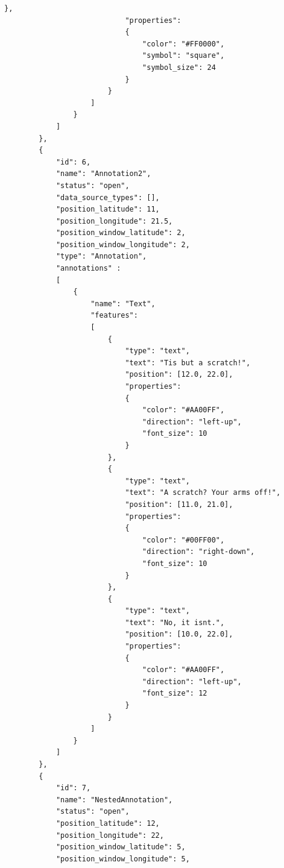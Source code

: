 \begin{lstlisting}[basicstyle=\small\ttfamily]
                            },
                            "properties":
                            {
                                "color": "#FF0000",
                                "symbol": "square",
                                "symbol_size": 24
                            }
                        }
                    ]
                }
            ]
        },
        {
            "id": 6,
            "name": "Annotation2",
            "status": "open",
            "data_source_types": [],
            "position_latitude": 11,
            "position_longitude": 21.5,
            "position_window_latitude": 2,
            "position_window_longitude": 2,
            "type": "Annotation",
            "annotations" :
            [
                {
                    "name": "Text",
                    "features":
                    [
                        {
                            "type": "text",
                            "text": "Tis but a scratch!",
                            "position": [12.0, 22.0],
                            "properties":
                            {
                                "color": "#AA00FF",
                                "direction": "left-up",
                                "font_size": 10
                            }
                        },
                        {
                            "type": "text",
                            "text": "A scratch? Your arms off!",
                            "position": [11.0, 21.0],
                            "properties":
                            {
                                "color": "#00FF00",
                                "direction": "right-down",
                                "font_size": 10
                            }
                        },
                        {
                            "type": "text",
                            "text": "No, it isnt.",
                            "position": [10.0, 22.0],
                            "properties":
                            {
                                "color": "#AA00FF",
                                "direction": "left-up",
                                "font_size": 12
                            }
                        }                        
                    ]
                }
            ]
        },
        {
            "id": 7,
            "name": "NestedAnnotation",
            "status": "open",
            "position_latitude": 12,
            "position_longitude": 22,
            "position_window_latitude": 5,
            "position_window_longitude": 5,

\end{lstlisting}
